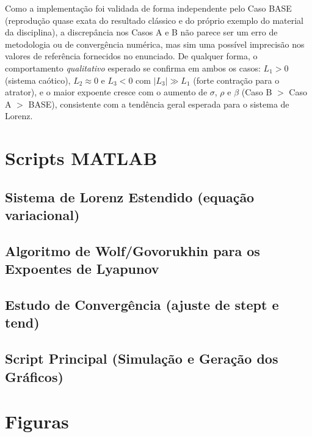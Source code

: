 \documentclass[a4paper,11pt]{article}
\begin{document}
Como a implementação foi validada de forma independente pelo Caso BASE
(reprodução quase exata do resultado clássico e do próprio exemplo do
material da disciplina), a discrepância nos Casos A e B não parece ser
um erro de metodologia ou de convergência numérica, mas sim uma
possível imprecisão nos valores de referência fornecidos no enunciado.
De qualquer forma, o comportamento \emph{qualitativo} esperado se
confirma em ambos os casos: $L_1>0$ (sistema caótico), $L_2\approx0$
e $L_3<0$ com $|L_3|\gg L_1$ (forte contração para o atrator), e o
maior expoente cresce com o aumento de $\sigma$, $\rho$ e $\beta$
(Caso B $>$ Caso A $>$ BASE), consistente com a tendência geral
esperada para o sistema de Lorenz.

\section{Scripts MATLAB}
\label{sec:scripts3}

\subsection{Sistema de Lorenz Estendido (equação variacional)}




\subsection{Algoritmo de Wolf/Govorukhin para os Expoentes de Lyapunov}


\subsection{Estudo de Convergência (ajuste de stept e tend)}


\subsection{Script Principal (Simulação e Geração dos Gráficos)}


\section{Figuras}
\end{document}
